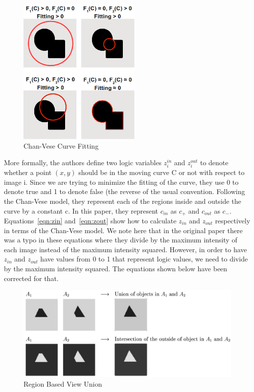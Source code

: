 \documentclass[10pt,twocolumn,letterpaper]{article}
\begin{document}
\begin{figure}[t!]
\centering
\includegraphics[width=6cm]{fitting.png}
\caption{Chan-Vese Curve Fitting}
\label{fig:fitting}
\end{figure}

More formally, the authors define two logic variables $z_{i}^{in}$ and $z_{i}^{out}$ to denote whether a point $(x,y)$ should be in the moving curve C or not
with respect to image i. Since we are trying to minimize the fitting of the curve, they use 0 to denote true and 1 to denote false (the reverse of the usual
convention. Following the Chan-Vese model, they represent each of the regions inside and outside the curve by a constant c. In this paper, they represent
$c_{in}$ as $c_{+}$ and $c_{out}$ as $c_{-}$. Equations~\ref{eqn:zin} and~\ref{eqn:zout} show how to calculate $z_{in}$ and $z_{out}$ respectively in terms of
the Chan-Vese model. We note here that in the original paper there was a typo in these equations where they divide by the maximum intensity of each image
instead of the maximum intensity squared. However, in order to have $z_{in}$ and $z_{out}$ have values from 0 to 1 that represent logic values, we need to
divide by the maximum intensity squared. The equations shown below have been corrected for that.

\begin{figure}[t]
\centering
\includegraphics[width=12cm]{logicop.png}
\caption{Region Based View Union}
\label{fig:logic-op}
\end{figure}
\end{document}
